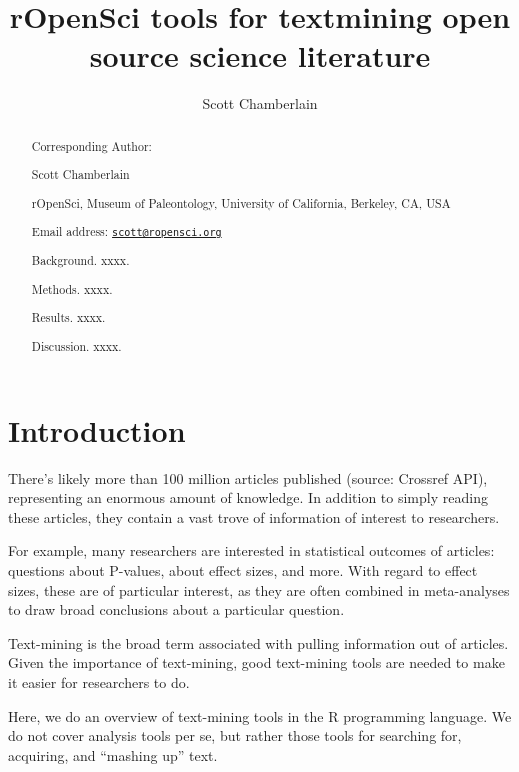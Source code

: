 \documentclass[author-year, review, 11pt]{components/elsarticle} %
\begin{document}
\begin{frontmatter}

  \title{rOpenSci tools for textmining open source science literature}
    \author[cstar]{Scott Chamberlain}
      \address[cstar]{rOpenSci, Museum of Paleontology, University of California, Berkeley,
CA, USA}
  
  \begin{abstract}
  Corresponding Author:
  
  Scott Chamberlain
  
  rOpenSci, Museum of Paleontology, University of California, Berkeley,
  CA, USA
  
  Email address:
  \href{mailto:scott@ropensci.org}{\nolinkurl{scott@ropensci.org}}
  
  \newpage
  
  Background. xxxx.
  
  Methods. xxxx.
  
  Results. xxxx.
  
  Discussion. xxxx.
  \end{abstract}
  
 \end{frontmatter}


\newpage

\section{Introduction}\label{introduction}

There's likely more than 100 million articles published (source:
Crossref API), representing an enormous amount of knowledge. In addition
to simply reading these articles, they contain a vast trove of
information of interest to researchers.

For example, many researchers are interested in statistical outcomes of
articles: questions about P-values, about effect sizes, and more. With
regard to effect sizes, these are of particular interest, as they are
often combined in meta-analyses to draw broad conclusions about a
particular question.

Text-mining is the broad term associated with pulling information out of
articles. Given the importance of text-mining, good text-mining tools
are needed to make it easier for researchers to do.

Here, we do an overview of text-mining tools in the R programming
language. We do not cover analysis tools per se, but rather those tools
for searching for, acquiring, and ``mashing up'' text.
\end{document}

